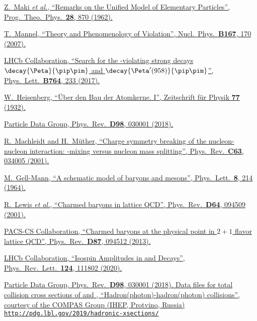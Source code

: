 \href{https://doi.org/10.1143/PTP.28.870}{Z.~Maki \textit{et al.}, \enquote{Remarks on the Unified Model of Elementary Particles}, Prog.\ Theo.\ Phys.\ \textbf{28}, 870 (1962).}

\href{https://doi.org/10.1016/j.nuclphysbps.2006.12.083}{T.~Mannel, \enquote{Theory and Phenomenology of \CP Violation}, Nucl.\ Phys.\ \textbf{B167}, 170 (2007).}

\href{https://doi.org/10.1016/j.physletb.2016.11.032}{LHCb Collaboration, \enquote{Search for the \CP-violating strong decays $\decay{\Peta}{\pip\pim}$ and $\decay{\Peta'(958)}{\pip\pim}$}, Phys.\ Lett.\ \textbf{B764}, 233 (2017).}

\href{https://doi.org/10.1007/BF01342433}{W.~Heisenberg, \enquote{Über den Bau der Atomkerne. I}, Zeitschrift für Physik \textbf{77} (1932).}

\href{https://link.aps.org/doi/10.1103/PhysRevD.98.030001}{Particle Data Group, Phys.\ Rev.\ \textbf{D98}, 030001 (2018).}

\href{https://doi.org/10.1103/PhysRevC.63.034005}{R.~Machleidt and H.~Müther, \enquote{Charge symmetry breaking of the nucleon-nucleon interaction: \Prho-\Pomega mixing versus nucleon mass splitting}, Phys.\ Rev.\ \textbf{C63}, 034005 (2001).}

\href{https://doi.org/10.1016/S0031-9163(64)92001-3}{M.~Gell-Mann, \enquote{A schematic model of baryons and mesons}, Phys.\ Lett.\ \textbf{8}, 214 (1964).}

\href{https://doi.org/10.1103/PhysRevD.64.094509}{R.~Lewis \textit{et al.}, \enquote{Charmed baryons in lattice QCD}, Phys.\ Rev.\ \textbf{D64}, 094509 (2001).}

\href{https://doi.org/10.1103/PhysRevD.87.094512}{PACS-CS Collaboration, \enquote{Charmed baryons at the physical point in $2+1$ flavor lattice QCD}, Phys.\ Rev.\ \textbf{D87}, 094512 (2013).}

\href{https://doi.org/10.1103/PhysRevLett.124.111802}{LHCb Collaboration, \enquote{Isospin Amplitudes in  and \decay{\Xibz}{\jpsi/\Xiz(\Lz)} Decays}, Phys.\ Rev.\ Lett.\ \textbf{124}, 111802 (2020).}

\href{http://pdg.lbl.gov/2019/hadronic-xsections/}{Particle Data Group, Phys.\ Rev.\ \textbf{D98}, 030001 (2018). Data files for total collision cross sections of \proton \pim and \proton \pip, \enquote{Hadron(photon)-hadron(photon) collisions}, courtesy of the COMPAS Group (IHEP, Protvino, Russia)\\ \texttt{http://pdg.lbl.gov/2019/hadronic-xsections/}}

